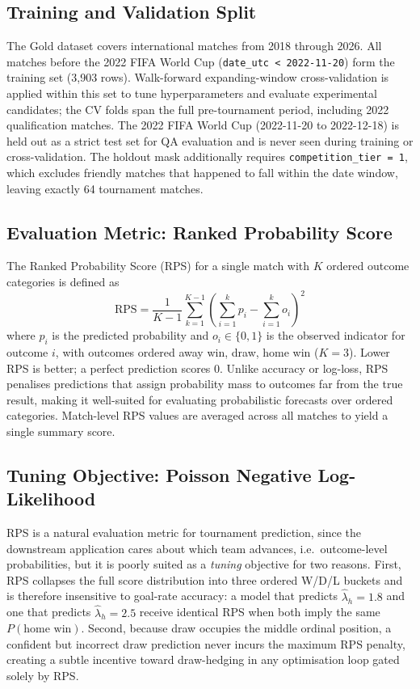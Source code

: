 \documentclass[conference]{IEEEtran}
\begin{document}
\subsection{Training and Validation Split}

The Gold dataset covers international matches from 2018 through 2026.
All matches before the 2022 FIFA World Cup (\texttt{date\_utc < 2022-11-20})
form the training set (3{,}903 rows). Walk-forward expanding-window
cross-validation is applied within this set to tune hyperparameters and
evaluate experimental candidates; the CV folds span the full pre-tournament
period, including 2022 qualification matches. 
The 2022 FIFA World Cup (2022-11-20 to 2022-12-18) is held out as a strict
test set for QA evaluation and is never seen during training or
cross-validation. The holdout mask additionally requires
\texttt{competition\_tier~=~1}, which excludes friendly matches that
happened to fall within the date window, leaving exactly 64 tournament
matches.

\subsection{Evaluation Metric: Ranked Probability Score}

The Ranked Probability Score (RPS) for a single match with $K$ ordered outcome
categories is defined as
\begin{equation}
  \text{RPS} = \frac{1}{K-1} \sum_{k=1}^{K-1}
  \left( \sum_{i=1}^{k} p_i - \sum_{i=1}^{k} o_i \right)^2
\end{equation}
where $p_i$ is the predicted probability and $o_i \in \{0,1\}$ is the observed
indicator for outcome $i$, with outcomes ordered away win, draw, home win ($K=3$).
Lower RPS is better; a perfect prediction scores 0. Unlike accuracy or log-loss, RPS
penalises predictions that assign probability mass to outcomes far from the true result,
making it well-suited for evaluating probabilistic forecasts over ordered categories.
Match-level RPS values are averaged across all matches to yield a single summary score.

\subsection{Tuning Objective: Poisson Negative Log-Likelihood}

RPS is a natural evaluation metric for tournament prediction, since the downstream
application cares about which team advances, i.e.\ outcome-level probabilities, but
it is poorly suited as a \emph{tuning} objective for two reasons.
First, RPS collapses the full score distribution into three ordered W/D/L buckets and
is therefore insensitive to goal-rate accuracy: a model that predicts
$\hat{\lambda}_h = 1.8$ and one that predicts $\hat{\lambda}_h = 2.5$ receive
identical RPS when both imply the same $P(\text{home win})$.
Second, because draw occupies the middle ordinal position, a confident but incorrect
draw prediction never incurs the maximum RPS penalty, creating a subtle incentive
toward draw-hedging in any optimisation loop gated solely by RPS.
\end{document}
